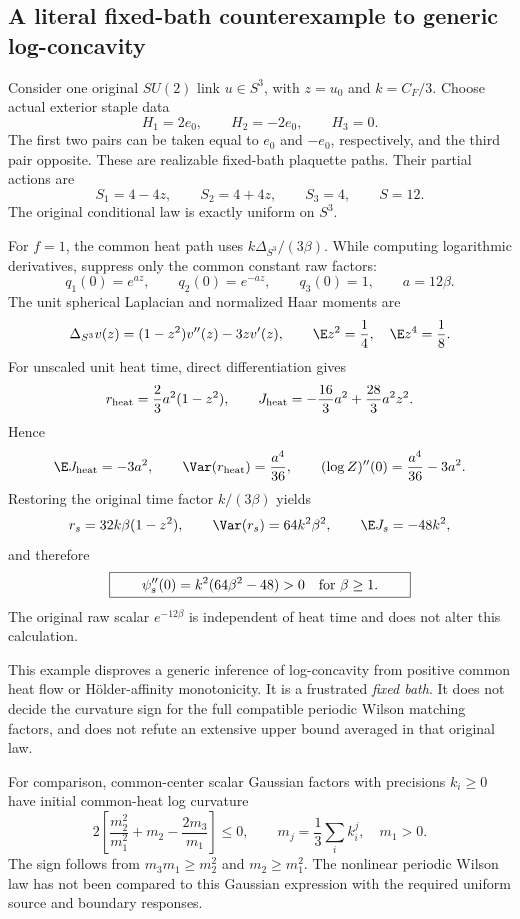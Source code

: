 \subsection{A literal fixed-bath counterexample to generic log-concavity}

Consider one original \(SU(2)\) link \(u\in S^3\), with \(z=u_0\) and \(k=C_F/3\). Choose actual exterior staple data
\[
 H_1=2e_0,\qquad H_2=-2e_0,\qquad H_3=0.
\]
The first two pairs can be taken equal to \(e_0\) and \(-e_0\), respectively, and the third pair opposite. These are realizable fixed-bath plaquette paths. Their partial actions are
\[
 S_1=4-4z,\qquad S_2=4+4z,\qquad S_3=4,\qquad S=12.
\]
The original conditional law is exactly uniform on \(S^3\).

For \(f=1\), the common heat path uses \(k\Delta_{S^3}/(3\beta)\).
While computing logarithmic derivatives, suppress only the common constant raw factors:
\[
 q_1(0)=e^{az},\qquad q_2(0)=e^{-az},\qquad q_3(0)=1,
 \qquad a=12\beta.
\]
The unit spherical Laplacian and normalized Haar moments are
\[
 \Delta_{S^3}v(z)=(1-z^2)v''(z)-3zv'(z),\qquad
 \E z^2=\frac14,\quad \E z^4=\frac18.
\]
For unscaled unit heat time, direct differentiation gives
\[
 r_{\rm heat}=\frac23a^2(1-z^2),\qquad
 J_{\rm heat}=-\frac{16}3a^2+\frac{28}3a^2z^2.
\]
Hence
\[
 \E J_{\rm heat}=-3a^2,\qquad
 \Var(r_{\rm heat})=\frac{a^4}{36},\qquad
 (\log Z)''(0)=\frac{a^4}{36}-3a^2.
\]
Restoring the original time factor \(k/(3\beta)\) yields
\begin{equation}
 r_s=32k\beta(1-z^2),\qquad
 \Var(r_s)=64k^2\beta^2,\qquad
 \E J_s=-48k^2,
 \label{rsm:frustratedmoments}
\end{equation}
and therefore
\begin{equation}
 \boxed{\qquad
 \psi_s''(0)=k^2(64\beta^2-48)>0
 \quad\hbox{for }\beta\ge1.
 \qquad}
 \label{rsm:positivecurvature}
\end{equation}
The original raw scalar \(e^{-12\beta}\) is independent of heat time and does not alter this calculation.

This example disproves a generic inference of log-concavity from positive common heat flow or H\"older-affinity monotonicity. It is a frustrated \emph{fixed bath}. It does not decide the curvature sign for the full compatible periodic Wilson matching factors, and does not refute an extensive upper bound averaged in that original law.

For comparison, common-center scalar Gaussian factors with precisions \(k_i\ge0\) have initial common-heat log curvature
\[
 2\left[\frac{m_2^2}{m_1^2}+m_2-\frac{2m_3}{m_1}\right]\le0,
 \qquad m_j=\frac13\sum_i k_i^j,\quad m_1>0.
\]
The sign follows from \(m_3m_1\ge m_2^2\) and \(m_2\ge m_1^2\). The nonlinear periodic Wilson law has not been compared to this Gaussian expression with the required uniform source and boundary responses.

